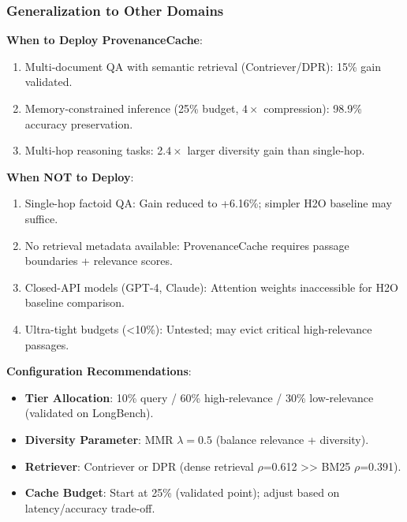 \subsubsection{Generalization to Other Domains}

\textbf{When to Deploy ProvenanceCache}:
\begin{enumerate}
\item Multi-document QA with semantic retrieval (Contriever/DPR): 15\% gain validated.
\item Memory-constrained inference (25\% budget, $4\times$ compression): 98.9\% accuracy preservation.
\item Multi-hop reasoning tasks: 2.$4\times$ larger diversity gain than single-hop.
\end{enumerate}

\textbf{When NOT to Deploy}:
\begin{enumerate}
\item Single-hop factoid QA: Gain reduced to +6.16\%; simpler H2O baseline may suffice.
\item No retrieval metadata available: ProvenanceCache requires passage boundaries + relevance scores.
\item Closed-API models (GPT-4, Claude): Attention weights inaccessible for H2O baseline comparison.
\item Ultra-tight budgets (<10\%): Untested; may evict critical high-relevance passages.
\end{enumerate}

\textbf{Configuration Recommendations}:
\begin{itemize}
\item \textbf{Tier Allocation}: 10\% query / 60\% high-relevance / 30\% low-relevance (validated on LongBench).
\item \textbf{Diversity Parameter}: MMR $\lambda =0.5$ (balance relevance + diversity).
\item \textbf{Retriever}: Contriever or DPR (dense retrieval $\rho$=0.612 >> BM25 $\rho$=0.391).
\item \textbf{Cache Budget}: Start at 25\% (validated point); adjust based on latency/accuracy trade-off.
\end{itemize}
